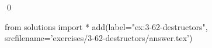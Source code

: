
\begin{ex}
  \label{ex:3-62-destructors}
  
  \qed
\end{ex}
\begin{python0}
from solutions import *
add(label="ex:3-62-destructors",
    srcfilename='exercises/3-62-destructors/answer.tex')
\end{python0}
